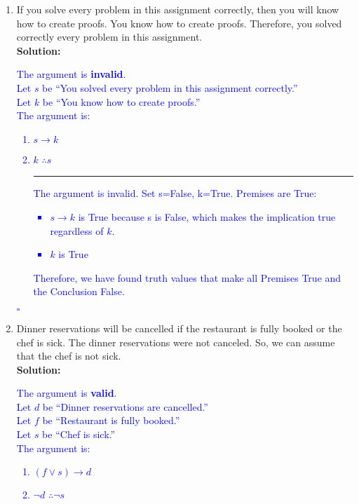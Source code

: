 \documentclass{article}
\renewcommand{\implies}{\rightarrow}
\newcommand{\sol}[1]{\textbf{Solution:\,}\textcolor{blue}{#1}}
\begin{document}
\begin{enumerate}
\begin{enumerate}
\item If you solve every problem in this assignment correctly, then you will know how to create proofs. You know how to create proofs. Therefore, you solved correctly every problem in this assignment.
\\\sol{The argument is \textbf{invalid}.\\
	Let $s$ be ``You solved every problem in this assignment correctly.''\\
	Let $k$ be ``You know how to create proofs.''\\ 
	The argument is:
\begin{enumerate}[label =(\arabic*), ref = \arabic*]
	\item $s\implies k$
	\item $k$ \hspace{50pt} $\therefore s$ \vspace{3pt}
	\vspace{5pt} \hrule \vspace{5pt}
	The argument is invalid. Set s=False, k=True. Premises are True:
        \begin{itemize}
        \item $s\implies k$ is True because s is False, which makes the implication true regardless of $k$.
        \item $k$ is True
        \end{itemize}
        Therefore, we have found truth values that make all Premises True and the Conclusion False.
\end{enumerate} 
\hfill $\square$
}
\item Dinner reservations will be cancelled if the restaurant is fully booked or the chef is sick. The dinner reservations were not canceled. So, we can assume that the chef is not sick.
\\\sol{The argument is \textbf{valid}.\\
	Let $d$ be ``Dinner reservations are cancelled.''\\
	Let $f$ be ``Restaurant is fully booked.''\\ 
	Let $s$ be ``Chef is sick.''\\ 
	The argument is:
\begin{enumerate}[label =(\arabic*), ref = \arabic*]
	\item $(f\lor s)\implies d$
	\item $\neg d$\hspace{50pt} $\therefore \neg s$ \vspace{3pt}

\end{enumerate}}
\end{enumerate}
\end{enumerate}
\end{document}
